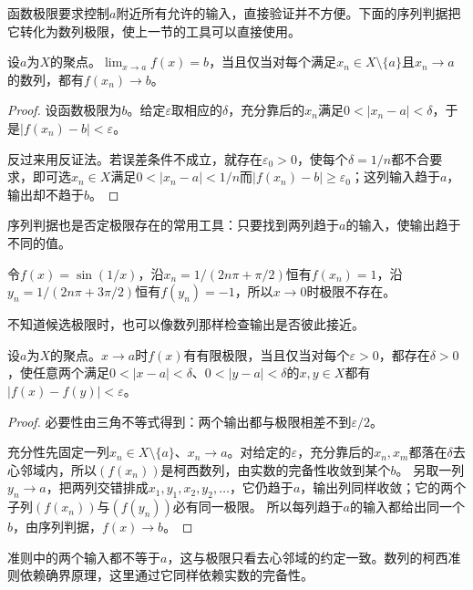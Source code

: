 函数极限要求控制$a$附近所有允许的输入，直接验证并不方便。下面的序列判据把它转化为数列极限，使上一节的工具可以直接使用。
\begin{theorem}[函数极限的序列判据]
\label{thm:ru-sequential-criterion}
设$a$为$X$的聚点。$\lim_{x\to a}f(x)=b$，当且仅当对每个满足$x_n\in X\setminus\{a\}$且$x_n\to a$的数列，都有$f(x_n)\to b$。
\end{theorem}
\begin{proof}
设函数极限为$b$。给定$\varepsilon$取相应的$\delta$，充分靠后的$x_n$满足$0<|x_n-a|<\delta$，于是$|f(x_n)-b|<\varepsilon$。

反过来用反证法。若误差条件不成立，就存在$\varepsilon_0>0$，使每个$\delta=1/n$都不合要求，即可选$x_n\in X$满足$0<|x_n-a|<1/n$而$|f(x_n)-b|\geq\varepsilon_0$；这列输入趋于$a$，输出却不趋于$b$。
\end{proof}
序列判据也是否定极限存在的常用工具：只要找到两列趋于$a$的输入，使输出趋于不同的值。
\begin{example}
\label{ex:ru-sin-reciprocal-no-limit}
令$f(x)=\sin(1/x)$，沿$x_n=1/(2n\pi+\pi/2)$恒有$f(x_n)=1$，沿$y_n=1/(2n\pi+3\pi/2)$恒有$f(y_n)=-1$，所以$x\to0$时极限不存在。
\end{example}

不知道候选极限时，也可以像数列那样检查输出是否彼此接近。
\begin{theorem}[函数极限的柯西准则]
\label{thm:ru-function-cauchy}
设$a$为$X$的聚点。$x\to a$时$f(x)$有有限极限，当且仅当对每个$\varepsilon>0$，都存在$\delta>0$，使任意两个满足$0<|x-a|<\delta$、$0<|y-a|<\delta$的$x,y\in X$都有$|f(x)-f(y)|<\varepsilon$。
\end{theorem}
\begin{proof}
必要性由三角不等式得到：两个输出都与极限相差不到$\varepsilon/2$。

充分性先固定一列$x_n\in X\setminus\{a\}$、$x_n\to a$。对给定的$\varepsilon$，充分靠后的$x_n,x_m$都落在$\delta$去心邻域内，所以$(f(x_n))$是柯西数列，由实数的完备性收敛到某个$b$。
另取一列$y_n\to a$，把两列交错排成$x_1,y_1,x_2,y_2,\ldots$，它仍趋于$a$，输出列同样收敛；它的两个子列$(f(x_n))$与$(f(y_n))$必有同一极限。
所以每列趋于$a$的输入都给出同一个$b$，由序列判据，$f(x)\to b$。
\end{proof}
准则中的两个输入都不等于$a$，这与极限只看去心邻域的约定一致。数列的柯西准则依赖确界原理，这里通过它同样依赖实数的完备性。

